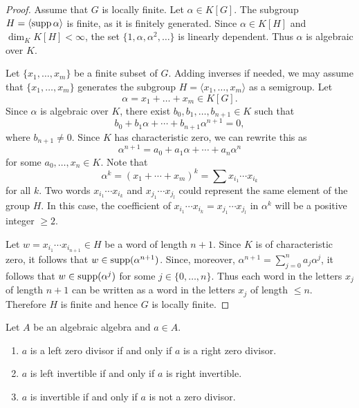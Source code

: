 \begin{proof}
	Assume that $G$ is locally finite. Let $\alpha\in K[G]$. The subgroup 
	$H=\langle\operatorname{supp}\alpha\rangle$ is finite, as it is finitely generated. Since 
	$\alpha\in K[H]$ and $\dim_KK[H]<\infty$, the set 
	$\{1,\alpha,\alpha^2,\dots\}$ is linearly dependent. Thus $\alpha$ is
	algebraic over $K$.

	Let $\{x_1,\dots,x_m\}$ be a finite subset of $G$. Adding inverses if needed,
	we may assume that $\{x_1,\dots,x_m\}$ generates the subgroup 
	$H=\langle x_1,\dots,x_m\rangle$ as a semigroup. Let 
	\[
	\alpha=x_1+\dots+x_m\in K[G].
	\]
	Since $\alpha$ is algebraic over $K$, 
	there exist $b_0,b_1,\dots,b_{n+1}\in K$ such that 
	\[
	b_0+b_1\alpha+\cdots+b_{n+1}\alpha^{n+1}=0,
	\]
	where $b_{n+1}\ne 0$. Since $K$ has characteristic zero, we can rewrite this as 
	\[
		\alpha^{n+1}=a_0+a_1\alpha+\cdots+a_n\alpha^n
	\]
	for some $a_0,\dots,x_n\in K$. 
	Note that 
	\[
		\alpha^{k}=(x_1+\cdots+x_m)^{k}
		=\sum x_{i_1}\cdots x_{i_{k}}
	\]
	for all $k$. 
	Two words $x_{i_1}\cdots x_{i_{k}}$ and 
	$x_{j_1}\cdots x_{j_{l}}$ could represent the same element of the group $H$. In this case, 
	the coefficient of $x_{i_1}\cdots x_{i_{k}}=x_{j_1}\cdots x_{j_{l}}$ 
	in $\alpha^{k}$ will be a positive integer $\geq2$. 
 
        Let $w=x_{i_1}\cdots
	x_{i_{n+1}}\in H$ be a word of length $n+1$. 
		Since $K$
	is of characteristic zero, it follows that $w\in\operatorname{supp}(\alpha^{n+1})$. Since, moreover,  
	$\alpha^{n+1}=\sum_{j=0}^na_j\alpha^j$, it follows that 
	$w\in\operatorname{supp}(\alpha^j)$ for some $j\in\{0,\dots,n\}$. Thus each
	word in the letters $x_j$ of length $n+1$ can be written as a word in the letters $x_j$ of 
	length $\leq n$. Therefore $H$ is finite and hence $G$ is locally finite. 
\end{proof}


\begin{exercise}
\label{xca:invertible_algebraic}
	Let $A$ be an algebraic algebra and $a\in A$.
	\begin{enumerate}
		\item $a$ is a left zero divisor if and only if $a$ is a right zero divisor.
		\item $a$ is left invertible if and only if $a$ is right invertible.
		\item $a$ is invertible if and only if $a$ is not a zero divisor.
	\end{enumerate}
\end{exercise}

